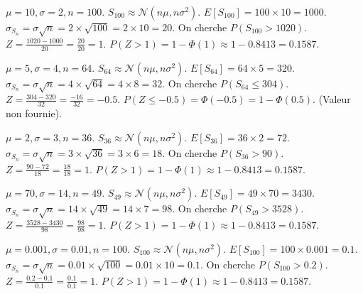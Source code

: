 \begin{correctionbox}
$\mu=10, \sigma=2, n=100$. $S_{100} \approx \mathcal{N}(n\mu, n\sigma^2)$.
$E[S_{100}] = 100 \times 10 = 1000$.
$\sigma_{S_n} = \sigma\sqrt{n} = 2 \times \sqrt{100} = 2 \times 10 = 20$.
On cherche $P(S_{100} > 1020)$.
$Z = \frac{1020 - 1000}{20} = \frac{20}{20} = 1$.
$P(Z > 1) = 1 - \Phi(1) \approx 1 - 0.8413 = 0.1587$.
\end{correctionbox}

\begin{correctionbox}
$\mu=5, \sigma=4, n=64$. $S_{64} \approx \mathcal{N}(n\mu, n\sigma^2)$.
$E[S_{64}] = 64 \times 5 = 320$.
$\sigma_{S_n} = \sigma\sqrt{n} = 4 \times \sqrt{64} = 4 \times 8 = 32$.
On cherche $P(S_{64} \le 304)$.
$Z = \frac{304 - 320}{32} = \frac{-16}{32} = -0.5$.
$P(Z \le -0.5) = \Phi(-0.5) = 1 - \Phi(0.5)$. (Valeur non fournie).
\end{correctionbox}

\begin{correctionbox}
$\mu=2, \sigma=3, n=36$. $S_{36} \approx \mathcal{N}(n\mu, n\sigma^2)$.
$E[S_{36}] = 36 \times 2 = 72$.
$\sigma_{S_n} = \sigma\sqrt{n} = 3 \times \sqrt{36} = 3 \times 6 = 18$.
On cherche $P(S_{36} > 90)$.
$Z = \frac{90 - 72}{18} = \frac{18}{18} = 1$.
$P(Z > 1) = 1 - \Phi(1) \approx 1 - 0.8413 = 0.1587$.
\end{correctionbox}

\begin{correctionbox}
$\mu=70, \sigma=14, n=49$. $S_{49} \approx \mathcal{N}(n\mu, n\sigma^2)$.
$E[S_{49}] = 49 \times 70 = 3430$.
$\sigma_{S_n} = \sigma\sqrt{n} = 14 \times \sqrt{49} = 14 \times 7 = 98$.
On cherche $P(S_{49} > 3528)$.
$Z = \frac{3528 - 3430}{98} = \frac{98}{98} = 1$.
$P(Z > 1) = 1 - \Phi(1) \approx 1 - 0.8413 = 0.1587$.
\end{correctionbox}

\begin{correctionbox}
$\mu=0.001, \sigma=0.01, n=100$. $S_{100} \approx \mathcal{N}(n\mu, n\sigma^2)$.
$E[S_{100}] = 100 \times 0.001 = 0.1$.
$\sigma_{S_n} = \sigma\sqrt{n} = 0.01 \times \sqrt{100} = 0.01 \times 10 = 0.1$.
On cherche $P(S_{100} > 0.2)$.
$Z = \frac{0.2 - 0.1}{0.1} = \frac{0.1}{0.1} = 1$.
$P(Z > 1) = 1 - \Phi(1) \approx 1 - 0.8413 = 0.1587$.
\end{correctionbox}

